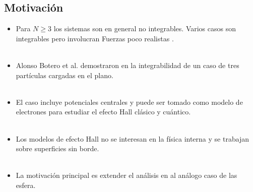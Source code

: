 \documentclass[xcolor=dvipsnames]{beamer}
\begin{document}
\subsection{Motivación}
\begin{frame}
\begin{itemize}
\item Para $N\geq 3$ los sistemas son en general no integrables. Varios casos son integrables pero involucran Fuerzas poco realistas \cite{strangeCases}.\\~\\ 
\item Alonso Botero et al. demostraron en \cite{alonso} la integrabilidad de un caso de tres partículas cargadas en el plano.\\~\\ 
\item El caso incluye potenciales centrales y puede ser tomado como modelo de electrones para estudiar el efecto Hall clásico y cuántico.\\~\\ 
\end{itemize}
\end{frame}
\begin{frame}
\begin{itemize}
\item Los modelos de efecto Hall no se interesan en la física interna y se trabajan sobre superficies sin borde\cite{schlief}. \\~\\
\item La motivación principal es extender el análisis en \cite{alonso} al análogo caso de las esfera.\\~\\
\end{itemize}
\end{frame}
\end{document}
